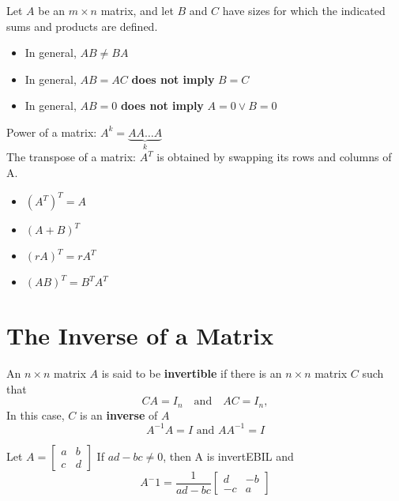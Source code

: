 \documentclass{report}
\begin{document}
\begin{tcolorbox}[colback=blue!5!white, colframe=red!75!black, title=WARNING]
Let $A$ be an $m \times n$ matrix, and let $B$ and $C$ have sizes for which the indicated sums and products are defined.

\begin{itemize}
    \item In general, $AB \ne BA$
    \item In general, $AB = AC$ \textbf{does not imply} $B = C$
    \item In general, $AB = 0$ \textbf{does not imply} $A = 0 \vee B = 0$
\end{itemize}
\end{tcolorbox}

Power of a matrix: $A^k = \underbrace{A A \dots A}_{k}$ \\

The transpose of a matrix: \( A^T \) is obtained by swapping its rows and columns of A.
\begin{theorem}\end{theorem}

\begin{tcolorbox}[colback=blue!5!white, colframe=blue!75!black]
\begin{itemize}
    \item $(A^T)^T = A$ 
    \item $(A + B)^T$ 
    \item $(rA)^T = r A^T$ 
    \item $(AB)^T = B^T A^T$ 
\end{itemize}
\end{tcolorbox}

\section{The Inverse of a Matrix}

An \( n \times n \) matrix \( A \) is said to be \textbf{invertible} if there is an \( n \times n \) matrix \( C \) such that
\[
C A = I_n \quad \text{and} \quad A C = I_n,
\]
In this case, $C$ is an \textbf{inverse} of $A$
\[
A^{-1} A = I \text{ and } A A^{-1} = I
\]

\begin{theorem}
    Let $A = \begin{bmatrix}
        a & b \\ c & d
    \end{bmatrix}$ 
    If $ad - bc \ne 0$, then A is invertEBIL and 
    \[
    A^-1 = \frac{1}{ad -bc}\begin{bmatrix}
        d & -b \\ -c & a
    \end{bmatrix}
    \]
\end{theorem}
\end{document}
